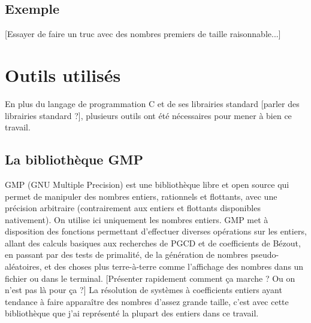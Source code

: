 \documentclass[french]{article}
\begin{document}
\subsection{Exemple}
[Essayer de faire un truc avec des nombres premiers de taille raisonnable...]
\section{Outils utilisés} \label{sec:outils}
En plus du langage de programmation C et de ses librairies standard [parler des librairies standard ?], plusieurs outils ont été nécessaires pour mener à bien ce travail.
\subsection{La bibliothèque GMP}
GMP (GNU Multiple Precision) est une bibliothèque libre et open source qui permet de manipuler des nombres entiers, rationnels et flottants, avec une précision arbitraire (contrairement aux entiers et flottants disponibles nativement). On utilise ici uniquement les nombres entiers. GMP met à disposition des fonctions permettant d'effectuer diverses opérations sur les entiers, allant des calculs basiques aux recherches de PGCD et de coefficients de Bézout, en passant par des tests de primalité, de la génération de nombres pseudo-aléatoires, et des choses plus terre-à-terre comme l'affichage des nombres dans un fichier ou dans le terminal. [Présenter rapidement comment ça marche ? Ou on n'est pas là pour ça ?] La résolution de systèmes à coefficients entiers ayant tendance à faire apparaître des nombres d'assez grande taille, c'est avec cette bibliothèque que j'ai représenté la plupart des entiers dans ce travail.
\end{document}
